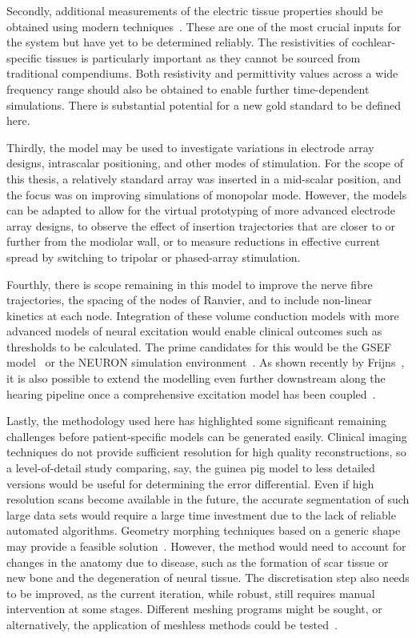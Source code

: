 Secondly, additional measurements of the electric tissue properties should be
obtained using modern techniques~\cite{spelman1990}. These are one of the most
crucial inputs for the system but have yet to be determined reliably. The
resistivities of cochlear-specific tissues is particularly important as they
cannot be sourced from traditional compendiums. Both resistivity and
permittivity values across a wide frequency range should also be obtained to
enable further time-dependent simulations. There is substantial potential for a
new gold standard to be defined here.

Thirdly, the model may be used to investigate variations in electrode array
designs, intrascalar positioning, and other modes of stimulation. For the scope
of this thesis, a relatively standard array was inserted in a mid-scalar
position, and the focus was on improving simulations of monopolar mode. However,
the models can be adapted to allow for the virtual prototyping of more advanced
electrode array designs, to observe the effect of insertion trajectories that
are closer to or further from the modiolar wall, or to measure reductions in
effective current spread by switching to tripolar or phased-array stimulation.

Fourthly, there is scope remaining in this model to improve the nerve fibre
trajectories, the spacing of the nodes of Ranvier, and to include non-linear
kinetics at each node. Integration of these volume conduction models with more
advanced models of neural excitation would enable clinical outcomes such as
thresholds to be calculated. The prime candidates for this would be the GSEF
model~\cite{frijns1995} or the NEURON simulation environment~\cite{hines1997}.
As shown recently by Frijns~\etal, it is also possible to extend the modelling
even further downstream along the hearing pipeline once a comprehensive
excitation model has been coupled~\cite{frijns2015ciap}.

Lastly, the methodology used here has highlighted some significant remaining
challenges before patient-specific models can be generated easily. Clinical
imaging techniques do not provide sufficient resolution for high quality
reconstructions, so a level-of-detail study comparing, say, the guinea pig model
to less detailed versions would be useful for determining the error
differential. Even if high resolution scans become available in the future, the
accurate segmentation of such large data sets would require a large time
investment due to the lack of reliable automated algorithms. Geometry morphing
techniques based on a generic shape may provide a feasible
solution~\cite{hanekom2015ciap}. However, the method would need to account for
changes in the anatomy due to disease, such as the formation of scar tissue or
new bone and the degeneration of neural tissue. The discretisation step also
needs to be improved, as the current iteration, while robust, still requires
manual intervention at some stages. Different meshing programs might be sought,
or alternatively, the application of meshless methods could be
tested~\cite{horton2006}.

